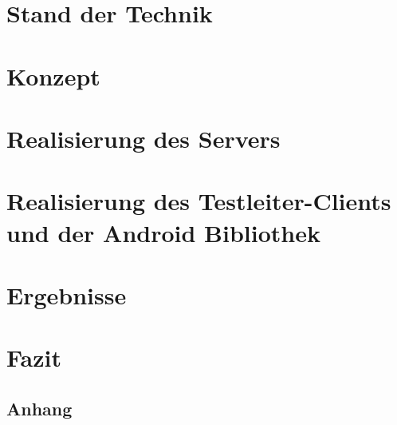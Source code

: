 \documentclass[12pt,a4paper,bibliography=totocnumbered,listof=totocnumbered]{scrartcl}
\begin{document}
\section{Stand der Technik}\label{sec:stand_der_technik}




\pagebreak

\section{Konzept}

\pagebreak


\pagebreak

\section{Realisierung des Servers\label{sec:realisierung_server}}




\pagebreak

\section{Realisierung des Testleiter-Clients und der Android Bibliothek}\label{sec:relisierung_client}



\pagebreak

\section{Ergebnisse}


\pagebreak
\section{Fazit}



\renewcommand\refname{Quellenverzeichnis}
\pagebreak
\singlespacing %
\setlength{\bibitemsep}{12pt} %
\printbibliography
\clearpage
{}
\setcounter{page}{1}

\begin{appendix}
\section*{Anhang}
{}





\end{appendix}



\end{document}
